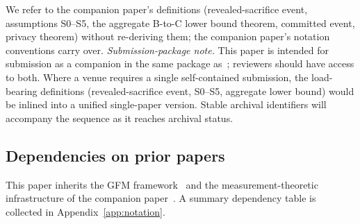We refer to the companion paper's definitions
(revealed-sacrifice event, assumptions S0--S5, the aggregate
B-to-C lower bound theorem, committed event, privacy theorem)
without re-deriving them; the companion paper's notation
conventions carry over.  \emph{Submission-package note.}  This
paper is intended for submission as a companion in the same
package as~\citep[Revealed~Sacrifice]{lasser2026paper8a}; reviewers should have
access to both.  Where a venue requires a single self-contained
submission, the load-bearing definitions (revealed-sacrifice
event, S0--S5, aggregate lower bound) would be inlined into a
unified single-paper version.  Stable archival identifiers
will accompany the sequence as it reaches archival status.

\subsection{Dependencies on prior papers}
\label{sec:dependencies}

This paper inherits the GFM
framework~\citep{lasser2026gfm,lasser2026poset,lasser2026horizon,lasser2026scm,lasser2026exo,lasser2026phase,lasser2026wamura}
and the measurement-theoretic infrastructure of the companion
paper~\citep[Revealed~Sacrifice]{lasser2026paper8a}.  A summary dependency table is
collected in Appendix~\ref{app:notation}.
